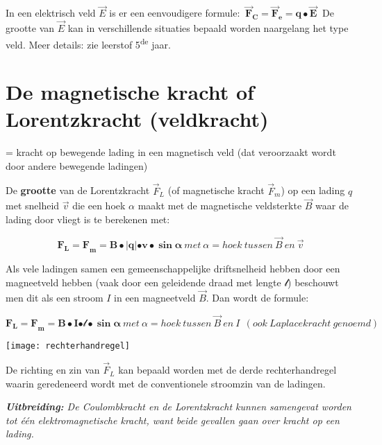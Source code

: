 \documentclass{ximera}
\begin{document}
In een elektrisch veld \(\overrightarrow{E}\) is er een eenvoudigere formule:
\(\ {\overrightarrow{\mathbf{F}}}_{\mathbf{C}}\mathbf{=}{\overrightarrow{\mathbf{F}}}_{\mathbf{e}}\mathbf{= q \bullet}\overrightarrow{\mathbf{E}}\mathbf{\ }\)
De grootte van \(\overrightarrow{E}\) kan in verschillende situaties bepaald worden naargelang het type veld. 
Meer details: zie leerstof 5\textsuperscript{de} jaar.


\section{De magnetische kracht of Lorentzkracht (veldkracht)}

= kracht op bewegende lading in een magnetisch veld (dat veroorzaakt wordt door andere bewegende ladingen)

De \textbf{grootte} van de Lorentzkracht \({\overrightarrow{F}}_{L}\) (of magnetische kracht \({\overrightarrow{F}}_{m}\)) op een lading \(q\) met snelheid \(\overrightarrow{v}\) die een hoek \(\alpha\) maakt met de magnetische veldsterkte \(\overrightarrow{B}\) waar de lading door vliegt is te berekenen met:

\[{\mathbf{F}_{\mathbf{L}}\mathbf{= F}}_{\mathbf{m}}\mathbf{= B \bullet}\left| \mathbf{q} \right|\mathbf{\bullet v \bullet}\mathbf{\sin}\mathbf{\alpha}\ met\ \alpha = hoek\ tussen\ \overrightarrow{B}\ en\ \overrightarrow{v}\]

Als vele ladingen samen een gemeenschappelijke driftsnelheid hebben door
een magneetveld hebben (vaak door een geleidende draad met lengte \(\mathcal{l}\)) beschouwt men dit als een stroom \(I\) in een magneetveld \(\overrightarrow{B}\). 
Dan wordt de formule:

\[{\mathbf{F}_{\mathbf{L}}\mathbf{= F}}_{\mathbf{m}}\mathbf{= B \bullet I}\mathcal{\bullet l \bullet}\mathbf{\sin}\mathbf{\alpha}\ met\ \alpha = hoek\ tussen\ \overrightarrow{B}\ en\ I\ \ (ook\ Laplacekracht\ genoemd)\]

\begin{image}
  \texttt{[image: rechterhandregel]}
\end{image}

De richting en zin van \({\overrightarrow{F}}_{L}\) kan bepaald worden met de derde rechterhandregel waarin geredeneerd wordt met de conventionele stroomzin van de ladingen.

\emph{\textbf{Uitbreiding:} De Coulombkracht en de Lorentzkracht kunnen samengevat worden tot één elektromagnetische kracht, want beide gevallen gaan over kracht op een lading.}
\end{document}
